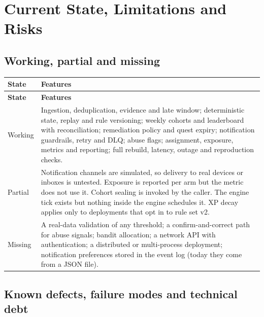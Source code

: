 \documentclass[11pt,a4paper]{article}
\newcommand{\hdr}[1]{\textbf{\color{white}\sffamily\small #1}}
\renewcommand{\_}{\textunderscore\allowbreak{}}
\begin{document}
\section{Current State, Limitations and Risks}
\label{sec:limits}

\subsection{Working, partial and missing}

\begin{xltabular}{\textwidth}{@{}L{2.4cm} Y@{}}
 \hdr{State} & \hdr{Features} \\
\endfirsthead
{} \hdr{State} & \hdr{Features} \\
\endhead
{} Working & Ingestion, deduplication, evidence and late window; deterministic state, replay and rule versioning; weekly cohorts and leaderboard with reconciliation; remediation policy and quest expiry; notification guardrails, retry and DLQ; abuse flags; assignment, exposure, metrics and reporting; full rebuild, latency, outage and reproduction checks. \\
Partial & Notification channels are simulated, so delivery to real devices or inboxes is untested. Exposure is reported per arm but the metric does not use it. Cohort sealing is invoked by the caller. The engine tick exists but nothing inside the engine schedules it. XP decay applies only to deployments that opt in to rule set v2. \\
 Missing & A real-data validation of any threshold; a confirm-and-correct path for abuse signals; bandit allocation; a network API with authentication; a distributed or multi-process deployment; notification preferences stored in the event log (today they come from a JSON file). \\
\end{xltabular}

\subsection{Known defects, failure modes and technical debt}
\end{document}
